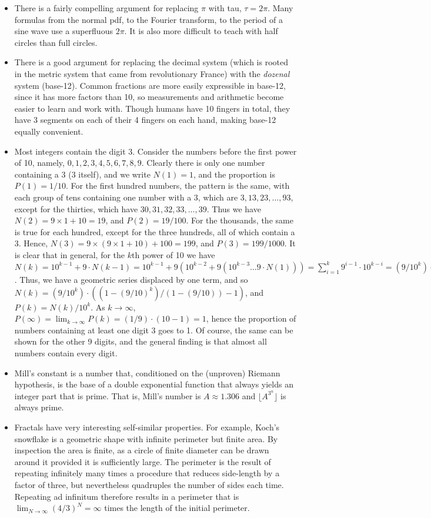 \documentclass[11pt]{amsart}
\begin{document}
\begin{itemize}
\item There is a fairly compelling argument for replacing $\pi$ with tau, $\tau = 2\pi$. Many formulas from the normal pdf, to the Fourier transform, to the period of a sine wave use a superfluous $2\pi$. It is also more difficult to teach with half circles than full circles.
\item There is a good argument for replacing the decimal system (which is rooted in the metric system that came from revolutionary France) with the \emph{dozenal} system (base-12). Common fractions are more easily expressible in base-12, since it has more factors than 10, so measurements and arithmetic become easier to learn and work with. Though humans have 10 fingers in total, they have 3 segments on each of their 4 fingers on each hand, making base-12 equally convenient.
\item Most integers contain the digit 3. Consider the numbers before the first power of 10, namely, $0, 1, 2, 3, 4, 5, 6, 7, 8, 9$. Clearly there is only one number containing a 3 (3 itself), and we write $N(1) = 1$, and the proportion is $P(1) = 1/10$. For the first hundred numbers, the pattern is the same, with each group of tens containing one number with a 3, which are $3, 13, 23, \dots, 93$, except for the thirties, which have $30, 31, 32, 33, \dots, 39$. Thus we have $N(2) = 9 \times 1 + 10 = 19$, and $P(2) = 19/100$. For the thousands, the same is true for each hundred, except for the three hundreds, all of which contain a 3. Hence, $N(3) = 9\times(9 \times 1 + 10) + 100 = 199$, and $P(3) = 199/1000$. It is clear that in general, for the $k$th power of 10 we have $N(k) = 10^{k-1} + 9\cdot N(k-1) = 10^{k-1} + 9(10^{k-2} + 9(10^{k-3} \dots 9\cdot N(1))) = \sum_{i=1}^{k}9^{i-1}\cdot10^{k-i} = (9/10^k)\cdot\sum_{i=1}^{k}(9/10)^i$. Thus, we have a geometric series displaced by one term, and so $N(k) =  (9/10^k)\cdot((1-(9/10)^k)/(1-(9/10)) - 1)$, and $P(k) = N(k)/10^k$. As $k \to \infty$, $P(\infty) = \lim_{k \to \infty} P(k) = (1/9)\cdot(10 - 1) = 1$, hence the proportion of numbers containing at least one digit 3 goes to 1. Of course, the same can be shown for the other 9 digits, and the general finding is that almost all numbers contain every digit.
\item Mill's constant is a number that, conditioned on the (unproven) Riemann hypothesis, is the base of a double exponential function that always yields an integer part that is prime. That is, Mill's number is $A \approx 1.306$ and $\lfloor A^{3^n}\rfloor$ is always prime.
\item Fractals have very interesting self-similar properties. For example, Koch's snowflake is a geometric shape with infinite perimeter but finite area. By inspection the area is finite, as a circle of finite diameter can be drawn around it provided it is sufficiently large. The perimeter is the result of repeating infinitely many times a procedure that reduces side-length by a factor of three, but nevertheless quadruples the number of sides each time. Repeating ad infinitum therefore results in a perimeter that is $\lim_{N \to \infty}(4/3)^N = \infty$ times the length of the initial perimeter.

\end{itemize}
\end{document}
